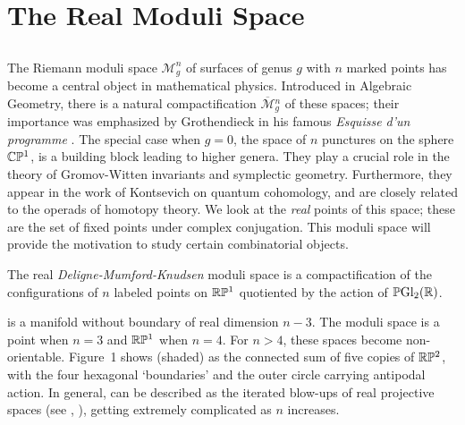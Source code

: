 \documentclass[10pt]{amsart}
\begin{document}
\maketitle

\baselineskip=15pt

\vspace{-.1in}


\section {The Real Moduli Space}

\subsection{}
The Riemann moduli space ${\mathcal M}_g^n$ of surfaces of genus $g$ with $n$ marked points has become a central object in mathematical physics.  Introduced in Algebraic Geometry, there is a natural compactification ${\overline{\mathcal M}}{_g^n}$ of these spaces; their importance was emphasized by Grothendieck in his famous \emph{Esquisse d'un programme} \cite{gro}. The special case when $g=0$, the space  of $n$ punctures on the sphere ${\mathbb C}{\mathbb P}^1$, is a building block leading to higher genera. They play a crucial role in the theory of Gromov-Witten invariants and symplectic geometry. Furthermore, they appear in the work of Kontsevich on quantum cohomology, and are closely related to the operads of homotopy theory.  We look at the {\em real} points  of this space; these are the set of fixed points under complex conjugation.  This moduli space will provide the motivation to study certain combinatorial objects.

\begin{defn}
The real {\em Deligne-Mumford-Knudsen} moduli space  is a compactification of the configurations of $n$ labeled points on ${\mathbb R} {\mathbb P}^1$ quotiented by the action of ${\mathbb P} {\rm Gl}_2({\mathbb R})$.
\end{defn}

 is a manifold without boundary of real dimension $n-3$. The moduli space is a point when $n=3$ and ${\mathbb R}{\mathbb P}^1$ when $n=4$. For $n>4$, these spaces become non-orientable. Figure~1 shows  (shaded) as the connected sum of five copies of ${\mathbb R} {\mathbb P}^2$, with the four hexagonal `boundaries' and the outer circle carrying antipodal action.  In general,  can be described as the iterated blow-ups of real projective spaces (see \cite[\S4]{kap}, \cite[\S4]{dev}), getting extremely complicated as $n$ increases.
\end{document}
